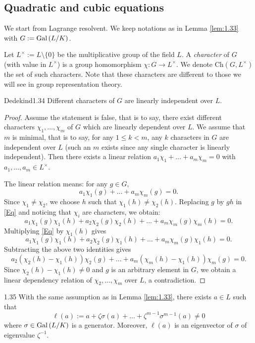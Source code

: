 \documentclass[twoside = false,	%
		headsepline,		%
		parskip = true,
		]{scrbook}						%
\begin{document}
    \subsection{Quadratic and cubic equations}

    {\color{blue}We start from Lagrange resolvent. We keep notations as in Lemma \ref{lem:1.33} with $G:=\mathrm{Gal}\left( L/K\right)$.
    
    Let $L^\times:=L\setminus\{0\}$ be the multiplicative group of the field $L$. A \emph{character} of $G$ (with value in $L^\times$) is a group homomorphism $\chi:G\to L^\times$. We denote $\mathrm{Ch}(G,L^\times)$ the set of such characters. Note that these characters are different to those we will see in group representation theory.
    
    \begin{lemma}{Dedekind}{1.34}
        Different characters of $G$ are linearly independent over $L$.
    \end{lemma}

    \begin{proof}
    Assume the statement is false, that is to say, there exist different characters $\chi_1,\ldots,\chi_m$ of $G$ which are linearly dependent over $L$. We assume that $m$ is minimal, that is to say, for any $1\leq k<m$, any $k$ characters in $G$ are independent over $L$ (such an $m$ exists since any single character is linearly independent). Then there exists a linear relation $a_1\chi_1+\ldots+a_m\chi_m=0$ with $a_1,\ldots,a_m\in L^\times$. 

    The linear relation means: for any $g\in G$, 
    \begin{equation}\label{Eq}
    a_1\chi_1(g)+\ldots+a_m\chi_m(g)=0.
    \end{equation} 
    Since $\chi_1\neq \chi_2$, we choose $h$ such that $\chi_1(h)\neq\chi_2(h)$. Replacing $g$ by $gh$ in \eqref{Eq} and noticing that $\chi_i$ are characters, we obtain:
    $$a_1\chi_1(g)\chi_1(h)+a_2\chi_2(g)\chi_2(h)+\ldots+a_m\chi_m(g)\chi_m(h)=0.$$
    Multiplying \eqref{Eq} by $\chi_1(h)$ gives
    $$a_1\chi_1(g)\chi_1(h)+a_2\chi_2(g)\chi_1(h)+\ldots+a_m\chi_m(g)\chi_1(h)=0.$$
    Subtracting the above two identities gives
    $$a_2(\chi_2(h)-\chi_1(h))\chi_2(g)+\ldots+a_m(\chi_m(h)-\chi_1(h))\chi_m(g)=0.$$
    Since $\chi_2(h)-\chi_1(h)\neq 0$ and $g$ is an arbitrary element in $G$, we obtain a linear dependency relation of $\chi_2,\ldots,\chi_m$ over $L$, a contradiction.
    \end{proof}


    \begin{corollary}{}{1.35}
        With the same assumption as in Lemma \ref{lem:1.33}, there exists $a\in L$ such that $$\ell(a):=a+\zeta\sigma(a)+\ldots+\zeta^{m-1}\sigma^{m-1}(a)\neq 0$$
        where $\sigma\in\mathrm{Gal}\left( L/K\right)$ is a generator. Moreover, $\ell(a)$ is an eigenvector of $\sigma$ of eigenvalue $\zeta^{-1}$.
    \end{corollary}

}
\end{document}
